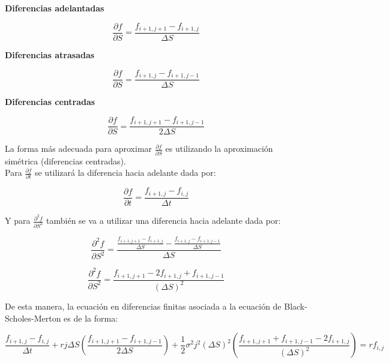 \documentclass{article}
\begin{document}
\textbf{Diferencias adelantadas}

\begin{equation}
  \frac{\partial{f}}{\partial{S}} = \frac{f_{i+1,j+1}-f_{i+1,j}}{\Delta S}  
\end{equation}

\textbf{Diferencias atrasadas}

\begin{equation}
 \frac{\partial{f}}{\partial{S}} = \frac{f_{i+1,j}-f_{i+1,j-1}}{\Delta S}   
\end{equation}

\textbf{Diferencias centradas}

\begin{equation}
 \frac{\partial{f}}{\partial{S}} = \frac{f_{i+1,j+1}-f_{i+1,j-1}}{2 \Delta S}
\end{equation}

La forma más adecuada para aproximar $\frac{\partial{f}}{\partial{S}}$ es utilizando la aproximación simétrica (diferencias centradas). \\

Para $\frac{\partial{f}}{\partial{t}}$ se utilizará la diferencia hacia adelante dada por:

\begin{equation}
  \frac{\partial{f}}{\partial{t}} = \frac{f_{i+1,j}-f_{i,j}}{\Delta t}  
\end{equation}

Y para $\frac{\partial^2{f}}{\partial{S^2}}$ también se va a utilizar una diferencia hacia adelante dada por:

\begin{equation}
  \frac{\partial^2{f}}{\partial{S^2}} = \frac{\frac{f_{i+1, j+1}-f_{i+1,j}}{\Delta S} - \frac{f_{i+1, j}-f_{i+1,j-1}}{\Delta S}}{\Delta S} 
\end{equation}

\begin{equation}
 \frac{\partial^2{f}}{\partial{S^2}} = \frac{f_{i+1,j+1} - 2f_{i+1,j} + f_{i+1,j-1} }{(\Delta S)^2}
\end{equation}

De esta manera, la ecuación en diferencias finitas asociada a la ecuación de Black-Scholes-Merton es de la forma:

\begin{equation*}
    \frac{f_{i+1,j}-f_{i,j}}{\Delta t} + rj\Delta S \left( \frac{f_{i+1,j+1}-f_{i+1,j-1}}{2 \Delta S} \right) + \frac{1}{2}\sigma^{2}j^{2}(\Delta S)^{2} \left( \frac{f_{i+1,j+1} + f_{i+1,j-1} - 2f_{i+1,j}}{(\Delta S)^2}\right) = r f_{i,j}
\end{equation*}
\end{document}
